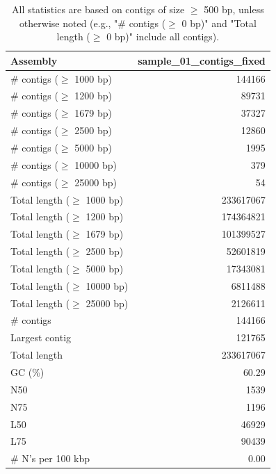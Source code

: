 \documentclass[12pt,a4paper]{article}
\begin{document}
\begin{table}[ht]
\begin{center}
\caption{All statistics are based on contigs of size $\geq$ 500 bp, unless otherwise noted (e.g., "\# contigs ($\geq$ 0 bp)" and "Total length ($\geq$ 0 bp)" include all contigs).}
\begin{tabular}{|l*{1}{|r}|}
\hline
Assembly & sample\_01\_contigs\_fixed \\ \hline
\# contigs ($\geq$ 1000 bp) & 144166 \\ \hline
\# contigs ($\geq$ 1200 bp) & 89731 \\ \hline
\# contigs ($\geq$ 1679 bp) & 37327 \\ \hline
\# contigs ($\geq$ 2500 bp) & 12860 \\ \hline
\# contigs ($\geq$ 5000 bp) & 1995 \\ \hline
\# contigs ($\geq$ 10000 bp) & 379 \\ \hline
\# contigs ($\geq$ 25000 bp) & 54 \\ \hline
Total length ($\geq$ 1000 bp) & 233617067 \\ \hline
Total length ($\geq$ 1200 bp) & 174364821 \\ \hline
Total length ($\geq$ 1679 bp) & 101399527 \\ \hline
Total length ($\geq$ 2500 bp) & 52601819 \\ \hline
Total length ($\geq$ 5000 bp) & 17343081 \\ \hline
Total length ($\geq$ 10000 bp) & 6811488 \\ \hline
Total length ($\geq$ 25000 bp) & 2126611 \\ \hline
\# contigs & 144166 \\ \hline
Largest contig & 121765 \\ \hline
Total length & 233617067 \\ \hline
GC (\%) & 60.29 \\ \hline
N50 & 1539 \\ \hline
N75 & 1196 \\ \hline
L50 & 46929 \\ \hline
L75 & 90439 \\ \hline
\# N's per 100 kbp & 0.00 \\ \hline
\end{tabular}
\end{center}
\end{table}
\end{document}

